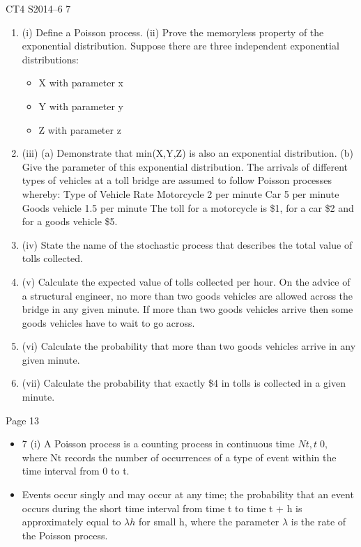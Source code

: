 \documentclass[a4paper,12pt]{article}
\begin{document}
CT4 S2014–6
7 
\begin{enumerate}
    \item (i) Define a Poisson process. 
\ite (ii) Prove the memoryless property of the exponential distribution. 
Suppose there are three independent exponential distributions:
\begin{itemize}
\item  X with parameter x
\item Y with parameter y
\item Z with parameter z
\end{itemize}
\item (iii) (a) Demonstrate that min(X,Y,Z) is also an exponential distribution.
(b) Give the parameter of this exponential distribution. 
The arrivals of different types of vehicles at a toll bridge are assumed to follow
Poisson processes whereby:
  Type of Vehicle Rate
Motorcycle 2 per minute
Car 5 per minute
Goods vehicle 1.5 per minute
The toll for a motorcycle is \$1, for a car \$2 and for a goods vehicle \$5.
\item (iv) State the name of the stochastic process that describes the total value of tolls
collected. 
\item (v) Calculate the expected value of tolls collected per hour. 
On the advice of a structural engineer, no more than two goods vehicles are allowed
across the bridge in any given minute. If more than two goods vehicles arrive then
some goods vehicles have to wait to go across.
\item (vi) Calculate the probability that more than two goods vehicles arrive in any given
minute. 
\item (vii) Calculate the probability that exactly \$4 in tolls is collected in a given minute.
\end{enumerate}
\newpage
Page 13
\begin{itemize}
    \item 7 (i) A Poisson process is a counting process in continuous time ${Nt ,t 0},$ where
Nt records the number of occurrences of a type of event within the time
interval from 0 to t.
  \item Events occur singly and may occur at any time;
the probability that an event occurs during the short time interval from time t
to time t + h is approximately equal to $\lambda h$ for small h, where the parameter $\lambda$  is
the rate of the Poisson process.
\end{itemize}
\end{document}
